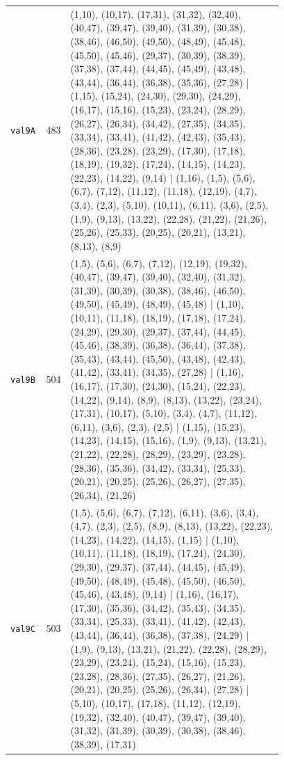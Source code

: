 \begin{landscape}
\begin{longtable}{lr>{\tiny\raggedright\arraybackslash}p{0.78\linewidth}}
\texttt{val9A} & 483 & (1,10), (10,17), (17,31), (31,32), (32,40), (40,47), (39,47), (39,40), (31,39), (30,38), (38,46), (46,50), (49,50), (48,49), (45,48), (45,50), (45,46), (29,37), (30,39), (38,39), (37,38), (37,44), (44,45), (45,49), (43,48), (43,44), (36,44), (36,38), (35,36), (27,28) | (1,15), (15,24), (24,30), (29,30), (24,29), (16,17), (15,16), (15,23), (23,24), (28,29), (26,27), (26,34), (34,42), (27,35), (34,35), (33,34), (33,41), (41,42), (42,43), (35,43), (28,36), (23,28), (23,29), (17,30), (17,18), (18,19), (19,32), (17,24), (14,15), (14,23), (22,23), (14,22), (9,14) | (1,16), (1,5), (5,6), (6,7), (7,12), (11,12), (11,18), (12,19), (4,7), (3,4), (2,3), (5,10), (10,11), (6,11), (3,6), (2,5), (1,9), (9,13), (13,22), (22,28), (21,22), (21,26), (25,26), (25,33), (20,25), (20,21), (13,21), (8,13), (8,9) \\[2pt]
\texttt{val9B} & 504 & (1,5), (5,6), (6,7), (7,12), (12,19), (19,32), (40,47), (39,47), (39,40), (32,40), (31,32), (31,39), (30,39), (30,38), (38,46), (46,50), (49,50), (45,49), (48,49), (45,48) | (1,10), (10,11), (11,18), (18,19), (17,18), (17,24), (24,29), (29,30), (29,37), (37,44), (44,45), (45,46), (38,39), (36,38), (36,44), (37,38), (35,43), (43,44), (45,50), (43,48), (42,43), (41,42), (33,41), (34,35), (27,28) | (1,16), (16,17), (17,30), (24,30), (15,24), (22,23), (14,22), (9,14), (8,9), (8,13), (13,22), (23,24), (17,31), (10,17), (5,10), (3,4), (4,7), (11,12), (6,11), (3,6), (2,3), (2,5) | (1,15), (15,23), (14,23), (14,15), (15,16), (1,9), (9,13), (13,21), (21,22), (22,28), (28,29), (23,29), (23,28), (28,36), (35,36), (34,42), (33,34), (25,33), (20,21), (20,25), (25,26), (26,27), (27,35), (26,34), (21,26) \\[2pt]
\texttt{val9C} & 503 & (1,5), (5,6), (6,7), (7,12), (6,11), (3,6), (3,4), (4,7), (2,3), (2,5), (8,9), (8,13), (13,22), (22,23), (14,23), (14,22), (14,15), (1,15) | (1,10), (10,11), (11,18), (18,19), (17,24), (24,30), (29,30), (29,37), (37,44), (44,45), (45,49), (49,50), (48,49), (45,48), (45,50), (46,50), (45,46), (43,48), (9,14) | (1,16), (16,17), (17,30), (35,36), (34,42), (35,43), (34,35), (33,34), (25,33), (33,41), (41,42), (42,43), (43,44), (36,44), (36,38), (37,38), (24,29) | (1,9), (9,13), (13,21), (21,22), (22,28), (28,29), (23,29), (23,24), (15,24), (15,16), (15,23), (23,28), (28,36), (27,35), (26,27), (21,26), (20,21), (20,25), (25,26), (26,34), (27,28) | (5,10), (10,17), (17,18), (11,12), (12,19), (19,32), (32,40), (40,47), (39,47), (39,40), (31,32), (31,39), (30,39), (30,38), (38,46), (38,39), (17,31) \\[2pt]

\end{longtable}
\end{landscape}
